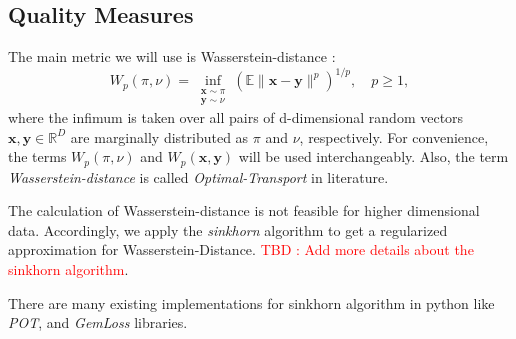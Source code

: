 \documentclass[11pt]{article}
\begin{document}
    \subsection{Quality Measures}\label{subsec:quality-measures}
    The main metric we will use is Wasserstein-distance \cite{Panaretos_2019}:
    \begin{equation}
        \label{eq:wasserstein-distance}
        W_p(\pi, \nu)=\inf _{\substack{\mathbf{x} \sim \pi \\ \mathbf{y} \sim \nu}}\left(\mathbb{E}\|\mathbf{x}-\mathbf{y}\|^p\right)^{1 / p}, \quad p \geq 1,
    \end{equation}
    where the infimum is taken over all pairs of d-dimensional random vectors $\mathbf{x},\mathbf{y} \in \mathbb{R}^D$ are marginally
    distributed as $\pi$ and $\nu$, respectively.
    For convenience, the terms $W_p(\pi, \nu)$ and $W_p(\mathbf{x}, \mathbf{y})$ will be used interchangeably.
    Also, the term \textit{Wasserstein-distance} is called \textit{Optimal-Transport} in literature\cite{Optpdf94:online}.


    The calculation of Wasserstein-distance is not feasible for higher dimensional data.
    Accordingly, we apply the \textit{sinkhorn} algorithm \cite{NIPS2013_af21d0c9} to get a regularized approximation for Wasserstein-Distance.
    \textcolor{red}{TBD : Add more details about the sinkhorn algorithm}.

    There are many existing implementations for sinkhorn algorithm in python like \textit{POT}\cite{JMLR:v22:20-451,POTPytho87:online},
    and \textit{GemLoss} \cite{Geometri81:online} libraries.

\end{document}
